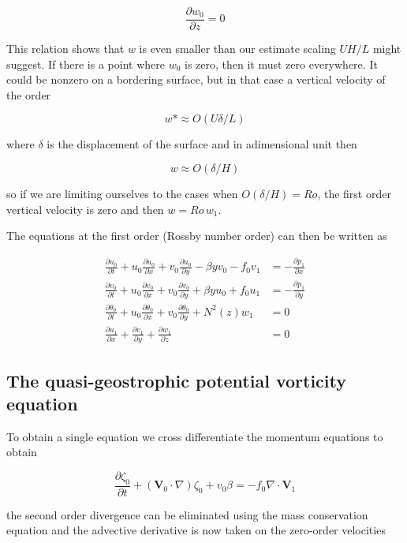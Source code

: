 \[\frac{\partial  w_0}{\partial z}=0\]

This relation shows that \(w\) is even smaller than our estimate scaling
\(UH/L\) might suggest. If there is a point where \(w_0\) is zero, then
it must zero everywhere. It could be nonzero on a bordering surface, but
in that case a vertical velocity of the order

\[w* \approx O(U \delta/L)\]

where \(\delta\) is the displacement of the surface and in adimensional
unit then

\[w \approx O(\delta/H)\]

so if we are limiting ourselves to the cases when \(O(\delta/H) = Ro\),
the first order vertical velocity is zero and then \(w = Ro\, w_1\).

The equations at the first order (Rossby number order) can then be
written as

{\[\begin{aligned}
\frac{\partial u_0}{\partial t}  + u_0\frac{\partial u_0}{\partial x} +v_0\frac{\partial u_0}{\partial y} -\beta y v_0 -  f_0 v_1 &= -\frac{\partial p_1}{\partial x}  \\ 
\frac{\partial v_0}{\partial t} +u_0\frac{\partial v_0}{\partial x} + v_0\frac{\partial v_0}{\partial y}  +\beta y u_0+  f_0 u_1  &= -\frac{\partial p_1}{\partial y}  \\
\frac{\partial \theta_0}{\partial t}  +u_0\frac{\partial \theta_0}{\partial x} +v_0\frac{\partial \theta_0}{\partial y}  + N^2(z) w_1   &= 0\\
\frac{\partial u_1}{\partial x}+\frac{\partial  v_1}{\partial y}+\frac{\partial w_1}{\partial z} &=0
\end{aligned}\]}

\subsection{The quasi-geostrophic potential vorticity
equation}\label{the-quasi-geostrophic-potential-vorticity-equation}

To obtain a single equation we cross differentiate the momentum
equations to obtain

{\[\frac{\partial \zeta_0}{\partial t} +(\mathbf{V}_0\cdot\nabla)\zeta_0 + v_0\beta=-f_0\nabla\cdot\mathbf{V}_1\]}

the second order divergence can be eliminated using the mass
conservation equation and the advective derivative is now taken on the
zero-order velocities

